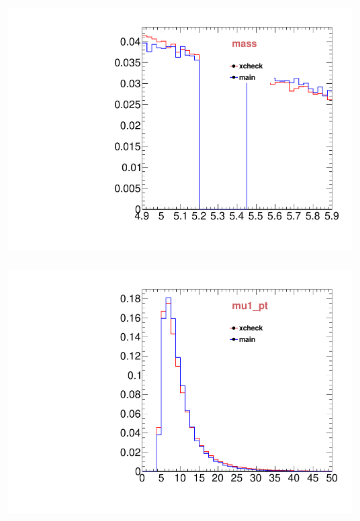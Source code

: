\begin{figure}
\begin{subfigure}[b]{0.2\textwidth}
                \includegraphics[width=\textwidth]{Figures/VariablesComparison/Data_barrel_figs/m}
                \label{fig:Data_barrel_m}
        \end{subfigure}
        \begin{subfigure}[b]{0.2\textwidth}
                \centering
                \includegraphics[width=\textwidth]{Figures/VariablesComparison/Data_barrel_figs/m1pt}
                \label{fig:Data_barrel_m1pt}
        \end{subfigure}
        \begin{subfigure}[b]{0.2\textwidth}
                \centering

\end{subfigure}
\end{figure}
